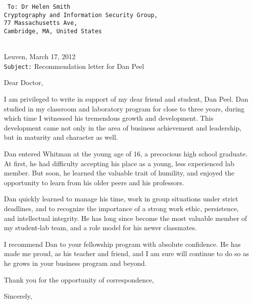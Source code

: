\documentclass[a4paper,11pt]{article}
\begin{document}
\begin{multicols}{2}
\hfill\vfill
\columnbreak
{
\tt \fontsize{10.5}{14}
To: Dr Helen Smith\\
Cryptography and Information Security Group,\\
77 Massachusetts Ave,\\
Cambridge, MA, United States
\\\\
}
\end{multicols}

Leuven, March 17, 2012\\
{\tt Subject:} Recommendation letter for Dan Peel

Dear Doctor, 

I am privileged to write in support of my dear friend and student, Dan Peel. Dan studied in my classroom and
laboratory program for close to three years, during which time I witnessed his tremendous growth and development. This
development came not only in the area of business achievement and leadership, but in maturity and character as well.

Dan entered Whitman at the young age of 16, a precocious high school graduate. At first, he had difficulty accepting his
place as a young, less experienced lab member. But soon, he learned the valuable trait of humility, and enjoyed the
opportunity to learn from his older peers and his professors.

Dan quickly learned to manage his time, work in group situations under strict deadlines, and to recognize the importance
of a strong work ethic, persistence, and intellectual integrity. He has long since become the most valuable member of
my student-lab team, and a role model for his newer classmates.

I recommend Dan to your fellowship program with absolute confidence. He has made me proud, as his teacher and friend,
and I am sure will continue to do so as he grows in your business program and beyond.

Thank you for the opportunity of correspondence,

Sincerely,
\end{document}
